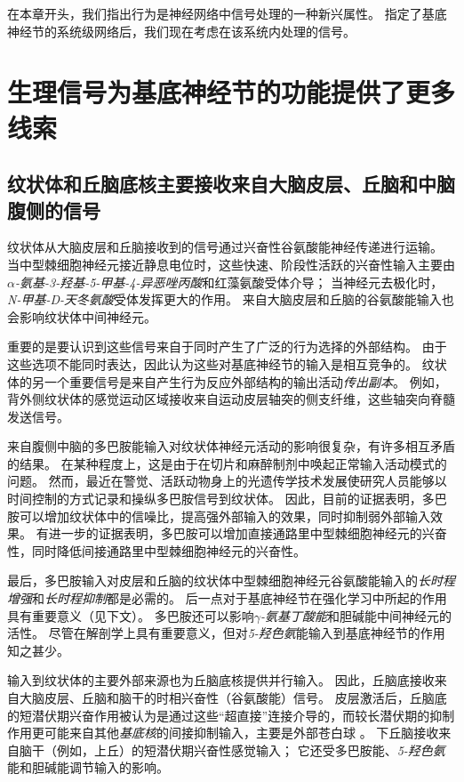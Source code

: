 在本章开头，我们指出行为是神经网络中信号处理的一种新兴属性。
指定了基底神经节的系统级网络后，我们现在考虑在该系统内处理的信号。



\section{生理信号为基底神经节的功能提供了更多线索}

\subsection{纹状体和丘脑底核主要接收来自大脑皮层、丘脑和中脑腹侧的信号}

纹状体从大脑皮层和丘脑接收到的信号通过兴奋性谷氨酸能神经传递进行运输。
当中型棘细胞神经元接近静息电位时，这些快速、阶段性活跃的兴奋性输入主要由\textit{$\alpha$-氨基-3-羟基-5-甲基-4-异恶唑丙酸}和红藻氨酸受体介导；
当神经元去极化时，\textit{N-甲基-D-天冬氨酸}受体发挥更大的作用。
来自大脑皮层和丘脑的谷氨酸能输入也会影响纹状体中间神经元。


重要的是要认识到这些信号来自于同时产生了广泛的行为选择的外部结构。
由于这些选项不能同时表达，因此认为这些对基底神经节的输入是相互竞争的。
纹状体的另一个重要信号是来自产生行为反应外部结构的输出活动\textit{传出副本}。
例如，背外侧纹状体的感觉运动区域接收来自运动皮层轴突的侧支纤维，这些轴突向脊髓发送信号。


来自腹侧中脑的多巴胺能输入对纹状体神经元活动的影响很复杂，有许多相互矛盾的结果。
在某种程度上，这是由于在切片和麻醉制剂中唤起正常输入活动模式的问题。
然而，最近在警觉、活跃动物身上的光遗传学技术发展使研究人员能够以时间控制的方式记录和操纵多巴胺信号到纹状体。
因此，目前的证据表明，多巴胺可以增加纹状体中的信噪比，提高强外部输入的效果，同时抑制弱外部输入效果。
有进一步的证据表明，多巴胺可以增加直接通路里中型棘细胞神经元的兴奋性，同时降低间接通路里中型棘细胞神经元的兴奋性。


最后，多巴胺输入对皮层和丘脑的纹状体中型棘细胞神经元谷氨酸能输入的\textit{长时程增强}和\textit{长时程抑制}都是必需的。
后一点对于基底神经节在强化学习中所起的作用具有重要意义（见下文）。
多巴胺还可以影响\textit{$\gamma$-氨基丁酸能}和胆碱能中间神经元的活性。
尽管在解剖学上具有重要意义，但对\textit{5-羟色氨}能输入到基底神经节的作用知之甚少。


输入到纹状体的主要外部来源也为丘脑底核提供并行输入。
因此，丘脑底接收来自大脑皮层、丘脑和脑干的时相兴奋性（谷氨酸能）信号。
皮层激活后，丘脑底的短潜伏期兴奋作用被认为是通过这些“超直接”连接介导的，而较长潜伏期的抑制作用更可能来自其他\textit{基底核}的间接抑制输入，主要是外部苍白球 。
下丘脑接收来自脑干（例如，上丘）的短潜伏期兴奋性感觉输入；
它还受多巴胺能、\textit{5-羟色氨}能和胆碱能调节输入的影响。



